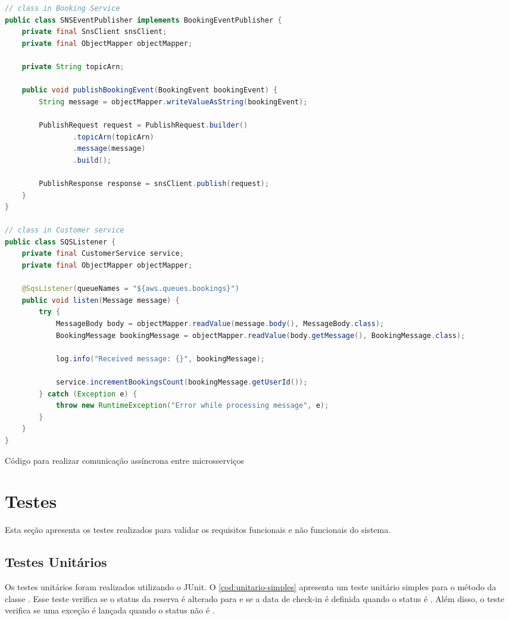 \begin{codigo}[H]
    \begin{lstlisting}[language=Java]
// class in Booking Service
public class SNSEventPublisher implements BookingEventPublisher {
    private final SnsClient snsClient;
    private final ObjectMapper objectMapper;

    private String topicArn;

    public void publishBookingEvent(BookingEvent bookingEvent) {
        String message = objectMapper.writeValueAsString(bookingEvent);

        PublishRequest request = PublishRequest.builder()
                .topicArn(topicArn)
                .message(message)
                .build();

        PublishResponse response = snsClient.publish(request);
    }
}

// class in Customer service
public class SQSListener {
    private final CustomerService service;
    private final ObjectMapper objectMapper;

    @SqsListener(queueNames = "${aws.queues.bookings}")
    public void listen(Message message) {
        try {
            MessageBody body = objectMapper.readValue(message.body(), MessageBody.class);
            BookingMessage bookingMessage = objectMapper.readValue(body.getMessage(), BookingMessage.class);

            log.info("Received message: {}", bookingMessage);

            service.incrementBookingsCount(bookingMessage.getUserId());
        } catch (Exception e) {
            throw new RuntimeException("Error while processing message", e);
        }
    }
}

    \end{lstlisting}
    \caption{Código para realizar comunicação assíncrona entre microsserviços}
    \label{cod:comunicacao-assincrona}
\end{codigo}

\section{Testes}
Esta seção apresenta os testes realizados para validar os requisitos funcionais e não funcionais do sistema.

\subsection{Testes Unitários}
Os testes unitários foram realizados utilizando o  JUnit. O \autoref{cod:unitario-simples} apresenta um teste unitário simples para o método  da classe . Esse teste verifica se o status da reserva é alterado para  e se a data de check-in é definida quando o status é . Além disso, o teste verifica se uma exceção é lançada quando o status não é .

